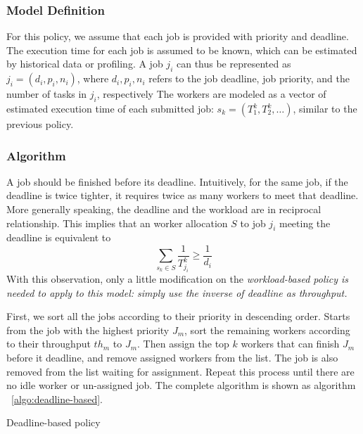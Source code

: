 \subsubsection{Model Definition}

For this policy, we assume that each job is provided with priority and
deadline.
The execution time for each job is assumed to be known, which can be 
estimated by historical data or profiling.
A job $j_i$ can thus be represented as $j_i = (d_i, p_i, n_i)$, where
$d_i, p_i, n_i$ refers to the job deadline, job priority, and the 
number of tasks in $j_i$, respectively
The workers are modeled as a vector of estimated execution time of each 
submitted job: $s_k = (T^k_1, T^k_2, \ldots)$, similar to the previous 
policy.

\subsubsection{Algorithm}

A job should be finished before its deadline.
Intuitively, for the same job, if the deadline is twice tighter, it
requires twice as many workers to meet that deadline.
More generally speaking, the deadline and the workload are in reciprocal
relationship.
This implies that an worker allocation $S$ to job $j_i$ meeting the
deadline is equivalent to
\[\displaystyle\sum_{s_k \in S}\frac{1}{T^k_{j_i}} \geq \frac{1}{d_i}\]
With this observation, only a little modification on the \em{workload-based}
policy is needed to apply to this model: simply use the inverse of
deadline as throughput.

First, we sort all the jobs according to their priority in descending
order.
Starts from the job with the highest priority $J_m$, sort the remaining
workers according to their throughput $th_m$ to $J_m$.
Then assign the top $k$ workers that can finish $J_m$ before it 
deadline, and remove assigned workers from the list.
The job is also removed from the list waiting for assignment.
Repeat this process until there are no idle worker or un-assigned job.
The complete algorithm is shown as algorithm ~\ref{algo:deadline-based}.

\begin{algorithm}[htbp]
  
  \caption{Deadline-based policy}
  \label{algo:deadline-based}
\end{algorithm}

